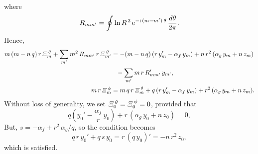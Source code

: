 \documentclass[12pt,prb,aps,notitlepage]{revtex4-1}
\begin{document}
where
\begin{equation}
R_{mm'} = \oint \ln R^{\,2}\,{\rm e}^{-{\rm i}\,(m-m')\,\theta}\,\frac{d\theta}{2\pi}.
\end{equation}
Hence,
\begin{align}
m\,(m-n\,q)\,r\,{\mit\Xi}_m^{\,\theta} + \sum_{m'}m^2\,R_{mm'}\,r\,{\mit\Xi}_{m'}^{\,\theta}&= -(m-n\,q)\left(r\,y_m' -\alpha_f\,y_m\right)+n\,r^2\,(\alpha_g\,y_m+n\,z_m)\nonumber\\[0.5ex]&\phantom{=}-
\sum_{m'}m\,r\,R_{mm'}'\,y_{m'},\\[0.5ex]
m\,r\,{\mit\Xi}_m^{\,\phi} &= m\,q\,r\,{\mit\Xi}_m^{\,\theta} +q\left(r\,y_m' -\alpha_f \,y_m\right)+r^2\,(\alpha_g\,y_m+n\,z_m).
\end{align}
Without loss of generality, we set ${\mit\Xi}_0^{\,\theta}= {\mit\Xi}_0^{\,\phi}=0$, provided that
\begin{equation}
q\left(y_0'-\frac{\alpha_f}{r}\,y_0\right) +r\,(\alpha_g\,y_0+n\,z_0) = 0,
\end{equation}
But, $s=-\alpha_f+r^2\,\alpha_g/q$, so the condition becomes
\begin{equation}
q\,r\,y_0' + q\,s\,y_0= r\,(q\,y_0)' = -n\,r^2\,z_0,
\end{equation}
which is satisfied. 
\end{document}
